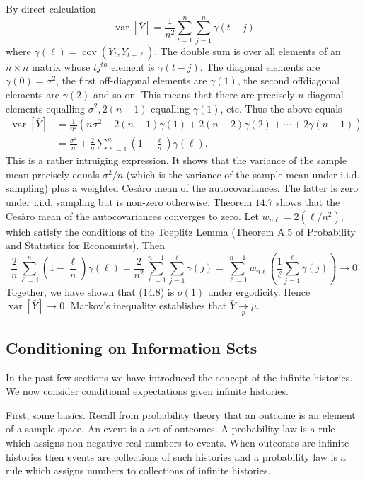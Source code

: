\documentclass[10pt]{article}
\begin{document}
By direct calculation
$$
\operatorname{var}[\bar{Y}]=\frac{1}{n^{2}} \sum_{t=1}^{n} \sum_{j=1}^{n} \gamma(t-j)
$$
where $\gamma(\ell)=\operatorname{cov}\left(Y_{t}, Y_{t+\ell}\right)$. The double sum is over all elements of an $n \times n$ matrix whose $t j^{t h}$ element is $\gamma(t-j)$. The diagonal elements are $\gamma(0)=\sigma^{2}$, the first off-diagonal elements are $\gamma(1)$, the second offdiagonal elements are $\gamma(2)$ and so on. This means that there are precisely $n$ diagonal elements equalling $\sigma^{2}, 2(n-1)$ equalling $\gamma(1)$, etc. Thus the above equals
$$
\begin{aligned}
\operatorname{var}[\bar{Y}] &=\frac{1}{n^{2}}\left(n \sigma^{2}+2(n-1) \gamma(1)+2(n-2) \gamma(2)+\cdots+2 \gamma(n-1)\right) \\
&=\frac{\sigma^{2}}{n}+\frac{2}{n} \sum_{\ell=1}^{n}\left(1-\frac{\ell}{n}\right) \gamma(\ell) .
\end{aligned}
$$
This is a rather intruiging expression. It shows that the variance of the sample mean precisely equals $\sigma^{2} / n$ (which is the variance of the sample mean under i.i.d. sampling) plus a weighted Cesàro mean of the autocovariances. The latter is zero under i.i.d. sampling but is non-zero otherwise. Theorem $14.7$ shows that the Cesàro mean of the autocovariances converges to zero. Let $w_{n \ell}=2\left(\ell / n^{2}\right)$, which satisfy the conditions of the Toeplitz Lemma (Theorem A.5 of Probability and Statistics for Economists). Then
$$
\frac{2}{n} \sum_{\ell=1}^{n}\left(1-\frac{\ell}{n}\right) \gamma(\ell)=\frac{2}{n^{2}} \sum_{\ell=1}^{n-1} \sum_{j=1}^{\ell} \gamma(j)=\sum_{\ell=1}^{n-1} w_{n \ell}\left(\frac{1}{\ell} \sum_{j=1}^{\ell} \gamma(j)\right) \longrightarrow 0
$$
Together, we have shown that (14.8) is $o(1)$ under ergodicity. Hence $\operatorname{var}[\bar{Y}] \rightarrow 0$. Markov's inequality establishes that $\bar{Y} \underset{p}{\longrightarrow} \mu$.

\subsection{Conditioning on Information Sets}
In the past few sections we have introduced the concept of the infinite histories. We now consider conditional expectations given infinite histories.

First, some basics. Recall from probability theory that an outcome is an element of a sample space. An event is a set of outcomes. A probability law is a rule which assigns non-negative real numbers to events. When outcomes are infinite histories then events are collections of such histories and a probability law is a rule which assigns numbers to collections of infinite histories.
\end{document}

